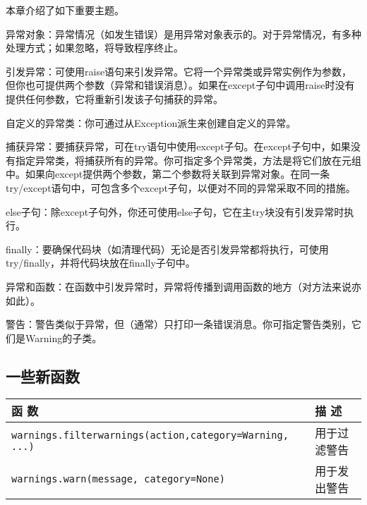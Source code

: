 本章介绍了如下重要主题。
\begin{dinglist}{43}
\item 异常对象：异常情况（如发生错误）是用异常对象表示的。对于异常情况，有多种处理方式；如果忽略，将导致程序终止。
\item 引发异常：可使用raise语句来引发异常。它将一个异常类或异常实例作为参数，但你也可提供两个参数（异常和错误消息）。如果在except子句中调用raise时没有提供任何参数，它将重新引发该子句捕获的异常。
\item 自定义的异常类：你可通过从Exception派生来创建自定义的异常。
\item 捕获异常：要捕获异常，可在try语句中使用except子句。在except子句中，如果没有指定异常类，将捕获所有的异常。你可指定多个异常类，方法是将它们放在元组中。如果向except提供两个参数，第二个参数将关联到异常对象。在同一条try/except语句中，可包含多个except子句，以便对不同的异常采取不同的措施。
\item else子句：除except子句外，你还可使用else子句，它在主try块没有引发异常时执行。
\item finally：要确保代码块（如清理代码）无论是否引发异常都将执行，可使用try/finally，并将代码块放在finally子句中。
\item 异常和函数：在函数中引发异常时，异常将传播到调用函数的地方（对方法来说亦如此）。
\item 警告：警告类似于异常，但（通常）只打印一条错误消息。你可指定警告类别，它们是Warning的子类。
\end{dinglist}

\subsection{一些新函数}
\begin{table}[H]
    \centering
    \begin{tabularx}{\textwidth}{lX}
        \hline
        函 数                                                          & 描 述    \\
        \hline
        \verb|warnings.filterwarnings(action,category=Warning, ...)| & 用于过滤警告 \\
        \verb|warnings.warn(message, category=None)|                 & 用于发出警告 \\
        \hline
    \end{tabularx}
\end{table}